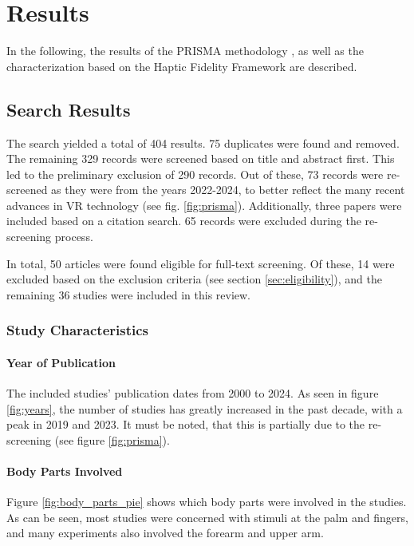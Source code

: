 \section{Results}
\label{sec:results}

In the following, the results of the PRISMA methodology \cite{Page2021TheReviews}, as well as the characterization based on the Haptic Fidelity Framework \cite{Muender2022HapticReality} are described.


\subsection{Search Results}

The search yielded a total of 404 results. 75 duplicates were found and removed. The remaining 329 records were screened based on title and abstract first. This led to the preliminary exclusion of 290 records. Out of these, 73 records were re-screened as they were from the years 2022-2024, to better reflect the many recent advances in VR technology (see fig. \ref{fig:prisma}). 
Additionally, three papers were included based on a citation search. 65 records were excluded during the re-screening process.

In total, 50 articles were found eligible for full-text screening. Of these, 14 were excluded based on the exclusion criteria (see section \ref{sec:eligibility}), and the remaining 36 studies were included in this review.


\subsubsection{Study Characteristics}
\paragraph{Year of Publication}
The included studies' publication dates from 2000 to 2024. As seen in figure \ref{fig:years}, the number of studies has greatly increased in the past decade, with a peak in 2019 and 2023. It must be noted, that this is partially due to the re-screening (see figure \ref{fig:prisma}). 

\paragraph{Body Parts Involved}
Figure \ref{fig:body_parts_pie} shows which body parts were involved in the studies. As can be seen, most studies were concerned with stimuli at the palm and fingers, and many experiments also involved the forearm and upper arm.

